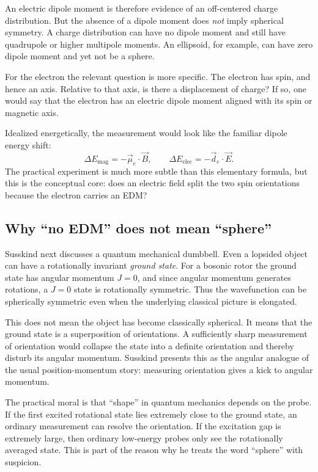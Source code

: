 An electric dipole moment is therefore evidence of an off-centered charge distribution. But the absence of a dipole moment does \emph{not} imply spherical symmetry. A charge distribution can have no dipole moment and still have quadrupole or higher multipole moments. An ellipsoid, for example, can have zero dipole moment and yet not be a sphere.

For the electron the relevant question is more specific. The electron has spin, and hence an axis. Relative to that axis, is there a displacement of charge? If so, one would say that the electron has an electric dipole moment aligned with its spin or magnetic axis.

Idealized energetically, the measurement would look like the familiar dipole energy shift:
\begin{equation}
\Delta E_{\text{mag}} = - \vec{\mu}_e \cdot \vec B,
\qquad
\Delta E_{\text{elec}} = - \vec d_e \cdot \vec E.
\end{equation}
The practical experiment is much more subtle than this elementary formula, but this is the conceptual core: does an electric field split the two spin orientations because the electron carries an EDM?

\subsection{Why ``no EDM'' does not mean ``sphere''}

Susskind next discusses a quantum mechanical dumbbell. Even a lopsided object can have a rotationally invariant \emph{ground state}. For a bosonic rotor the ground state has angular momentum \(J=0\), and since angular momentum generates rotations, a \(J=0\) state is rotationally symmetric. Thus the wavefunction can be spherically symmetric even when the underlying classical picture is elongated.

This does not mean the object has become classically spherical. It means that the ground state is a superposition of orientations. A sufficiently sharp measurement of orientation would collapse the state into a definite orientation and thereby disturb its angular momentum. Susskind presents this as the angular analogue of the usual position-momentum story: measuring orientation gives a kick to angular momentum.

The practical moral is that ``shape'' in quantum mechanics depends on the probe. If the first excited rotational state lies extremely close to the ground state, an ordinary measurement can resolve the orientation. If the excitation gap is extremely large, then ordinary low-energy probes only see the rotationally averaged state. This is part of the reason why he treats the word ``sphere'' with suspicion.

